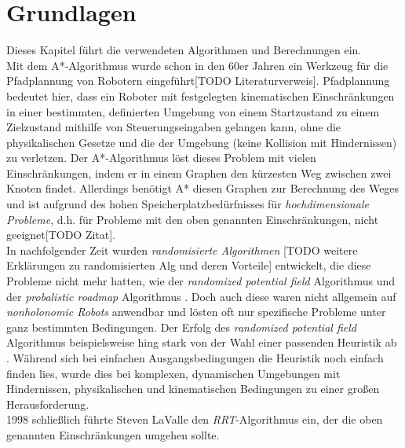 \section{Grundlagen}
Dieses Kapitel führt die verwendeten Algorithmen und Berechnungen ein.\\
Mit dem A*-Algorithmus wurde schon in den 60er Jahren ein Werkzeug für die Pfadplannung von Robotern eingeführt[TODO Literaturverweis]. Pfadplannung bedeutet hier, dass ein Roboter mit festgelegten kinematischen Einschränkungen in einer bestimmten, definierten Umgebung von einem Startzustand zu einem Zielzustand mithilfe von Steuerungseingaben gelangen kann, ohne die physikalischen Gesetze und die der Umgebung (keine Kollision mit Hindernissen) zu verletzen. Der A*-Algorithmus löst dieses Problem mit vielen Einschränkungen, indem er in einem Graphen den kürzesten Weg zwischen zwei Knoten findet. Allerdings benötigt A* diesen Graphen zur Berechnung des Weges und ist aufgrund des hohen Speicherplatzbedürfnisses für \textit{hochdimensionale Probleme}, d.h. für Probleme mit den oben genannten Einschränkungen, nicht geeignet[TODO Zitat].\\
In nachfolgender Zeit wurden \textit{randomisierte Algorithmen} [TODO weitere Erklärungen zu randomisierten Alg und deren Vorteile] entwickelt, die diese Probleme nicht mehr hatten, wie der \textit{randomized potential field} Algorithmus \citep{BaLa91} und der \textit{probalistic roadmap} Algorithmus \citep{AmWu96}. Doch auch diese waren nicht allgemein auf \textit{nonholonomic Robots} anwendbar und lösten oft nur spezifische Probleme unter ganz bestimmten Bedingungen. Der Erfolg des \textit{randomized potential field} Algorithmus beispielsweise hing stark von der Wahl einer passenden Heuristik ab \citep[vgl. Kap 3.4][]{BaLa91}. Während sich bei einfachen Ausgangsbedingungen die Heuristik noch einfach finden lies, wurde dies bei komplexen, dynamischen Umgebungen mit Hindernissen, physikalischen und kinematischen Bedingungen zu einer großen Herausforderung. \\
1998 schließlich führte Steven LaValle den \textit{RRT}-Algorithmus ein, der die oben genannten Einschränkungen umgehen sollte.

